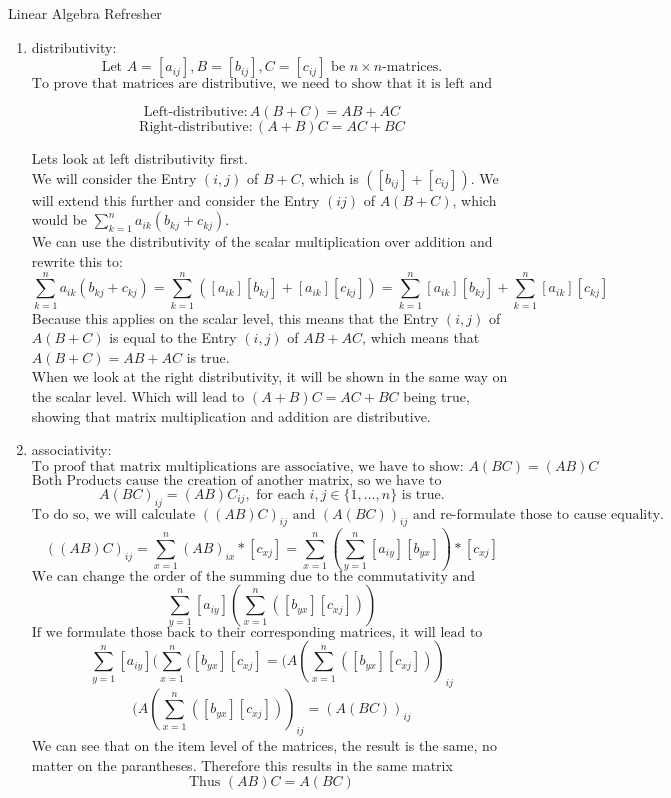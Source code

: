\documentclass[
	english,
        solution=true
	]{tudaexercise}
\begin{document}
\begin{task}[points=28]{Linear Algebra Refresher}
\begin{subtask}[points=5,title=Matrix Properties]
\begin{solution}
\begin{enumerate}
    \item distributivity:
    \[\text{Let $A=[a_{ij}], B=[b_{ij}], C=[c_{ij}]$ be $n\times n$-matrices.}\]
    \[\text{To prove that matrices are distributive, we need to show that it is left and right distributive:}\]

    \[\text{Left-distributive}: A(B+C)=AB+AC\]
    \[\text{Right-distributive}: (A+B)C=AC+BC\]

   Lets look at left distributivity first.\\
   We will consider the Entry $(i, j)$ of $B+C$, which is $([b_{ij}]+[c_{ij}])$. We will extend this further and consider the Entry $(ij)$ of $A(B+C)$, which would be $\sum^n_{k=1} a_{ik}(b_{kj}+c_{kj})$.\\
   We can use the distributivity of the scalar multiplication over addition and rewrite this to:
   \[\sum^n_{k=1} a_{ik}(b_{kj}+c_{kj})=\sum^n_{k=1}([a_{ik}][b_{kj}]+[a_{ik}][c_{kj}])=\sum^n_{k=1} [a_{ik}][b_{kj}]+\sum^n_{k=1} [a_{ik}][c_{kj}]\]
   Because this applies on the scalar level, this means that the Entry $(i, j)$ of $A(B+C)$ is equal to the Entry $(i, j)$ of $AB+AC$, which means that $A(B+C)=AB+AC$ is true.\\

   When we look at the right distributivity, it will be shown in the same way on the scalar level. Which will lead to $(A+B)C=AC+BC$ being true, showing that matrix multiplication and addition are distributive.

    \item associativity:
    \[\text{To proof that matrix multiplications are associative, we have to show: } A(BC) = (AB)C\]
    \[\text{Both Products cause the creation of another matrix, so we have to specifically show, that }\]
    \[A(BC)_{ij}=(AB)C_{ij}, \text{ for each } i, j\in\{1, ..., n\} \text{ is true}.\]
    \[\text{To do so, we will calculate $((AB)C)_{ij}$ and $(A(BC))_{ij}$ and re-formulate those to cause equality.}\]
    \[((AB)C)_{ij}=\sum^n_{x=1}(AB)_{ix}*[c_{xj}]=\sum^n_{x=1}(\sum^n_{y=1}[a_{iy}][b_{yx}])*[c_{xj}]\]
    \[\text{We can change the order of the summing due to the commutativity and associativity of addition with the scalars.}\]
    \[\sum^n_{y=1}[a_{iy}](\sum^n_{x=1}([b_{yx}][c_{xj}]))\]
    \[\text{If we formulate those back to their corresponding matrices, it will lead to following :}\]
    \[\sum^n_{y=1}[a_{iy}](\sum^n_{x=1}([b_{yx}][c_{xj}]=(A(\sum^n_{x=1}([b_{yx}][c_{xj}]))_{ij}\]
    \[(A(\sum^n_{x=1}([b_{yx}][c_{xj}]))_{ij}=(A(BC))_{ij}\]
    We can see that on the item level of the matrices, the result is the same, no matter on the parantheses. Therefore this results in the same matrix
    \[\text{Thus $(AB)C=A(BC)$}\]
   

\end{enumerate}
\end{solution}
\end{subtask}
\end{task}
\end{document}
